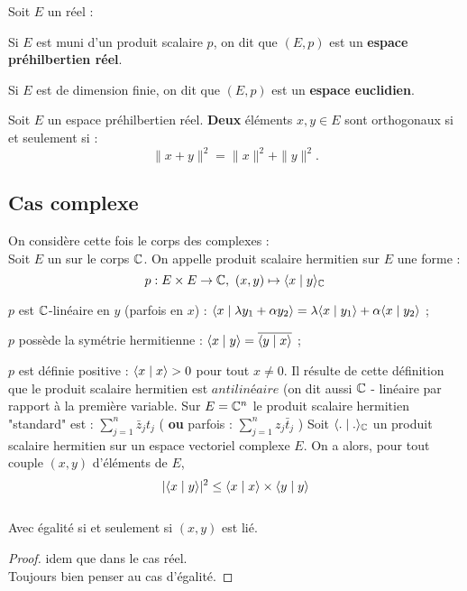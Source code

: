 \bd
\ben
Soit $E$ un \ev réel :
\item Si $E$ est  muni d'un produit scalaire $p$, on dit que $(E,p)$ est un \textbf{espace préhilbertien réel}.
\item Si $E$ est de dimension finie, on dit que $(E,p)$ est un \textbf{espace euclidien}.
\een
\ed

Soit $E$ un espace préhilbertien réel. \textbf{Deux} éléments $x,y \in E$ sont orthogonaux si et seulement si : $$\|x+y\|^2 = \|x\|^2 + \| y \|^2.$$
\ep
\subsection{Cas complexe}
\bd
On considère cette fois le corps des complexes : \\
Soit $E$ un \ev sur le corps $\mathbb{C}$. On appelle produit scalaire hermitien sur $E$ une forme : $$ p : E \times E \to \mathbb{C}, ~ (x,y) \mapsto \langle x \mid y \rangle_{\mathbb{C}}$$
\ben
\item $p$ est $\mathbb{C}$-linéaire en $y$ (parfois en $x$) : $\langle x \mid \lambda y_1 + \alpha y_2 \rangle = \lambda \langle x \mid y_1 \rangle + \alpha \langle x \mid y_2 \rangle$ ; 
\item $p$ possède la symétrie hermitienne : $\langle x \mid y \rangle = \overline{\langle y \mid x \rangle }$ ;
\item $p$ est définie positive : $\langle x \mid x \rangle > 0$ pour tout $x \ne 0$.
\een
\ed
\bw 
Il résulte de cette définition que le produit scalaire hermitien est $antilinéaire$ (on dit aussi $\mathbb{C}$ - linéaire par rapport à la première variable.
\ew
\bw
Sur $E = \mathbb{C}^n$ le produit scalaire hermitien "standard" est : $\displaystyle \sum_{j=1}^n \bar{z}_j t_j$ \big( \textbf{ou} parfois : $\displaystyle \sum_{j=1}^n z_j \bar{t}_j$ \big)
\ew
{}
Soit $\langle.\mid.\rangle_{\mathbb{C}}$ un produit scalaire hermitien sur un espace vectoriel complexe $E$. On a alors, pour tout couple $(x,y)$ d'éléments de $E$, 
$$| \langle x \mid y \rangle | ^2 \leq \langle x \mid x \rangle \times \langle y \mid y \rangle$$\\
Avec égalité si et seulement si $(x,y)$ est lié.
\ep
\begin{proof}
	idem que dans le cas réel.\\
	Toujours bien penser au cas d'égalité.
\end{proof}

